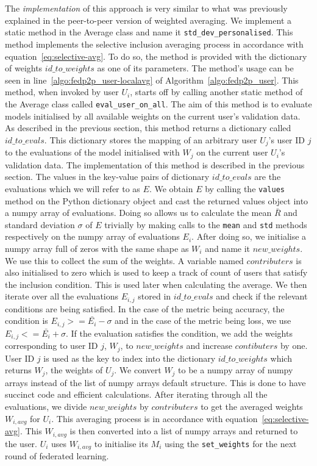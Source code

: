 \documentclass[12pt]{article}
\begin{document}
\\\\
The \textit{implementation} of this approach is very similar to what was previously explained in the peer-to-peer version of weighted averaging. We implement a static method in the Average class and name it \texttt{std\_dev\_personalised}. This method implements the selective inclusion averaging process in accordance with equation~\ref{eq:selective-avg}. To do so, the method is provided with the dictionary of weights $id\_to\_weights$ as one of its parameters. The method's usage can be seen in line~\ref{algo:fedp2p_user-localavg} of Algorithm~\ref{algo:fedp2p_user}. This method, when invoked by user $U_i$, starts off by calling another static method of the Average class called \texttt{eval\_user\_on\_all}. The aim of this method is to evaluate models initialised by all available weights on the current user's validation data. As described in the previous section, this method returns a dictionary called $id\_to\_evals$. This dictionary stores the mapping of an arbitrary user $U_j$'s user ID $j$ to the evaluations of the model initialised with $W_j$ on the current user $U_i$'s validation data. The implementation of this method is described in the previous section. The values in the key-value pairs of dictionary $id\_to\_evals$ are the evaluations which we will refer to as $E$. We obtain $E$ by calling the \texttt{values} method on the Python dictionary object and cast the returned values object into a numpy array of evaluations. Doing so allows us to calculate the mean $\bar{R}$ and standard deviation $\sigma$ of $E$ trivially by making calls to the \texttt{mean} and \texttt{std} methods respectively on the numpy array of evaluations $E_i$. After doing so, we initialise a numpy array full of zeros with the same shape as $W_i$ and name it $new\_weights$. We use this to collect the sum of the weights. A variable named $contributers$ is also initialised to zero which is used to keep a track of count of users that satisfy the inclusion condition. This is used later when calculating the average. We then iterate over all the evaluations $E_{i,j}$ stored in $id\_to\_evals$ and check if the relevant conditions are being satisfied. In the case of the metric being accuracy, the condition is $E_{i,j} >= \bar{E_i}-\sigma$ and in the case of the metric being loss, we use $E_{i,j} <= \bar{E_i}+\sigma$. If the evaluation satisfies the condition, we add the weights corresponding to user ID $j$, $W_j$, to $new\_weights$ and increase $contibuters$ by one. User ID $j$ is used as the key to index into the dictionary $id\_to\_weights$ which returns $W_j$, the weights of $U_j$. We convert $W_j$ to be a numpy array of numpy arrays instead of the list of numpy arrays default structure. This is done to have succinct code and efficient calculations. After iterating through all the evaluations, we divide $new\_weights$ by $contributers$ to get the averaged weights $W_{i,avg}$ for $U_i$. This averaging process is in accordance with equation~\ref{eq:selective-avg}. This $W_{i,avg}$ is then converted into a list of numpy arrays and returned to the user. $U_i$ uses $W_{i,avg}$ to initialise its $M_i$ using the \texttt{set\_weights} for the next round of federated learning. 
\end{document}
